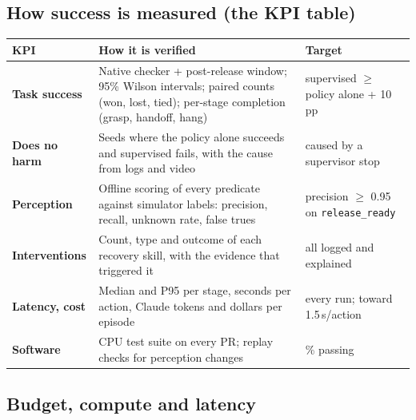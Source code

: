 \documentclass[11pt,a4paper]{article}
\newcommand{\tool}[1]{\texttt{\small #1}}
\begin{document}
\subsection{How success is measured (the KPI table)}

\begin{center}\small
\begin{tabularx}{\linewidth}{@{}>{\bfseries}l X >{\raggedright\arraybackslash}p{3.4cm}@{}}
\toprule
KPI & How it is verified & Target\\
\midrule
Task success & Native checker + post-release window; 95\% Wilson intervals; paired counts (won, lost, tied); per-stage completion (grasp, handoff, hang) & supervised $\ge$ policy alone + 10\,pp\\
Does no harm & Seeds where the policy alone succeeds and supervised fails, with the cause from logs and video & 0 caused by a supervisor stop\\
Perception & Offline scoring of every predicate against simulator labels: precision, recall, unknown rate, false trues & precision $\ge$ 0.95 on \tool{release\_ready}\\
Interventions & Count, type and outcome of each recovery skill, with the evidence that triggered it & all logged and explained\\
Latency, cost & Median and P95 per stage, seconds per action, Claude tokens and dollars per episode & every run; toward 1.5\,s/action\\
Software & CPU test suite on every PR; replay checks for perception changes & 100\% passing\\
\bottomrule
\end{tabularx}
\end{center}

\subsection{Budget, compute and latency}
\end{document}
